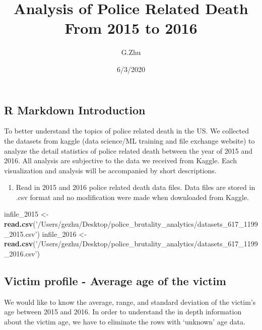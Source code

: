 \documentclass[
]{article}
\title{Analysis of Police Related Death From 2015 to 2016}
\author{G.Zhu}
\date{6/3/2020}
\newenvironment{Shaded}{\begin{snugshade}}{\end{snugshade}}
\newcommand{\DecValTok}[1]{\textcolor[rgb]{0.00,0.00,0.81}{#1}}
\newcommand{\KeywordTok}[1]{\textcolor[rgb]{0.13,0.29,0.53}{\textbf{#1}}}
\newcommand{\NormalTok}[1]{#1}
\newcommand{\StringTok}[1]{\textcolor[rgb]{0.31,0.60,0.02}{#1}}
\providecommand{\tightlist}{%
  \setlength{\itemsep}{0pt}\setlength{\parskip}{0pt}}
\begin{document}
\maketitle

\hypertarget{r-markdown-introduction}{%
\subsection{R Markdown Introduction}\label{r-markdown-introduction}}

To better understand the topics of police related death in the US. We
collected the datasets from kaggle (data science/ML training and file
exchange website) to analyze the detail statistics of police related
death between the year of 2015 and 2016. All analysis are subjective to
the data we received from Kaggle. Each visualization and analysis will
be accompanied by short descriptions.

\begin{enumerate}
\def\labelenumi{\arabic{enumi}.}
\tightlist
\item
  Read in 2015 and 2016 police related death data files. Data files are
  stored in .csv format and no modification were made when downloaded
  from Kaggle.
\end{enumerate}

\begin{Shaded}
\begin{Highlighting}[]
\NormalTok{infile_}\DecValTok{2015}\NormalTok{ <-}\StringTok{ }\KeywordTok{read.csv}\NormalTok{(}\StringTok{'/Users/gezhu/Desktop/police_brutality_analytics/datasets_617_1199_2015.csv'}\NormalTok{)}
\NormalTok{infile_}\DecValTok{2016}\NormalTok{ <-}\StringTok{ }\KeywordTok{read.csv}\NormalTok{(}\StringTok{'/Users/gezhu/Desktop/police_brutality_analytics/datasets_617_1199_2016.csv'}\NormalTok{)}
\end{Highlighting}
\end{Shaded}

\hypertarget{victim-profile---average-age-of-the-victim}{%
\subsection{Victim profile - Average age of the
victim}\label{victim-profile---average-age-of-the-victim}}

We would like to know the average, range, and standard deviation of the
victim's age between 2015 and 2016. In order to understand the in depth
information about the victim age, we have to eliminate the rows with
`unknown' age data.
\end{document}
